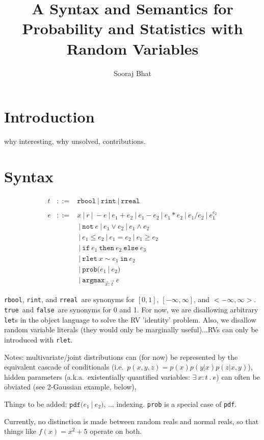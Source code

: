 \documentclass{article}
\title{A Syntax and Semantics for\\Probability and Statistics with Random Variables}
\author{Sooraj Bhat}
\newcommand{\E}[1]{\ensuremath{#1}}
\newcommand{\T}[1]{\texttt{#1}}
\newcommand{\rbool}{\T{rbool}}
\newcommand{\rint}{\T{rint}}
\newcommand{\rreal}{\T{rreal}}
\newcommand{\true}{\T{true}}
\newcommand{\false}{\T{false}}
\newcommand{\rlet}[3]{\E{\T{rlet}\ #1 \sim #2 \ \T{in}\ #3}}
\newcommand{\pdf}[2]{\E{\T{pdf(} #1 \ | \ #2 \T{)}}}
\newcommand{\prob}[2]{\E{\T{prob(} #1 \ | \ #2 \T{)}}}
\newcommand{\thereis}[3]{\E{\exists\ #1 : #2 \ . \ #3}}
\newcommand{\Not}{\T{not}}
\newcommand{\argmax}[2]{\E{\T{argmax}_{#1}\ #2}}
\newcommand{\ite}[3]{\E{\T{if}\ #1\ \T{then}\ #2\ \T{else}\ #3}}
\begin{document}
\maketitle
\section{Introduction}
%
why interesting, why unsolved, contributions.
%
\section{Syntax}
% 
\begin{eqnarray*}
t & ::= & \rbool \ | \ \rint \ | \ \rreal \\ %
& & \\
e & ::= & x \ | \ r 
    \ | \ -e \ | \ e_1 + e_2 \ | \ e_1 - e_2 
    \ | \ e_1 * e_2 \ | \ e_1 / e_2 \ | \ e_1^{e_2} \\
& & \ | \ \Not\ e \ | \ e_1 \vee e_2 \ | \ e_1 \wedge e_2 \\
& & \ | \ e_1 \leq e_2 \ | \ e_1 = e_2 \ | \ e_1 \geq e_2 \\
& & \ | \ \ite{e_1}{e_2}{e_3} \\
& & \ | \ \rlet{x}{e_1}{e_2} \\
& & \ | \ \prob{e_1}{e_2} \\
& & \ | \ \argmax{\vec{x}:\vec{t}}{e}
\end{eqnarray*}

\rbool, \rint, and \rreal\ are synonyms for $[0,1]$,
$[-\infty,\infty]$, and $<-\infty,\infty>$. \true\ and \false\ are
synonyms for 0 and 1.  For now, we are disallowing arbitrary {\tt
let}s in the object language to solve the RV 'identity' problem.
Also, we disallow random variable literals (they would only be
marginally useful)...RVs can only be introduced with \T{rlet}.

Notes: multivariate/joint distributions can (for now) be represented
by the equivalent cascade of conditionals (i.e.\ $p(x,y,z) =
p(x)p(y|x)p(z|x,y)$), hidden parameters (a.k.a.\ existentially
quantified variables: \thereis{x}{t}{e}) can often be obviated (see
2-Gaussian example, below),

Things to be added: \pdf{e_1}{e_2}, ... indexing. \T{prob} is a
special case of \T{pdf}.

Currently, no distinction is made between random reals and normal
reals, so that things like $f(x) = x^2 + 5$ operate on both.
\end{document}

